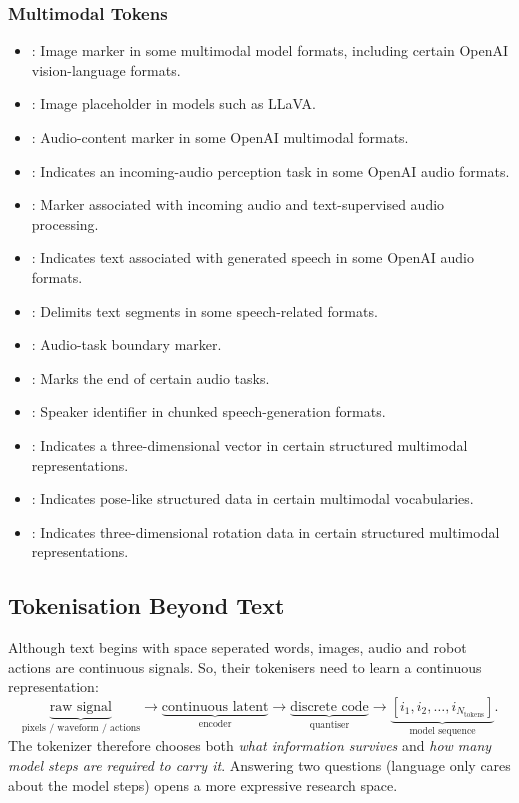 \subsubsection{Multimodal Tokens}

\begin{itemize}
    \item {}: Image marker in some multimodal model formats, including certain OpenAI vision-language formats.
    \item {}: Image placeholder in models such as LLaVA.
    \item {}: Audio-content marker in some OpenAI multimodal formats.
    \item {}: Indicates an incoming-audio perception task in some OpenAI audio formats.
    \item {}: Marker associated with incoming audio and text-supervised audio processing.
    \item {}: Indicates text associated with generated speech in some OpenAI audio formats.
    \item {}: Delimits text segments in some speech-related formats.
    \item {}: Audio-task boundary marker.
    \item {}: Marks the end of certain audio tasks.
    \item {}: Speaker identifier in chunked speech-generation formats.
    \item {}: Indicates a three-dimensional vector in certain structured multimodal representations.
    \item {}: Indicates pose-like structured data in certain multimodal vocabularies.
    \item {}: Indicates three-dimensional rotation data in certain structured multimodal representations.
\end{itemize}




\subsection{Tokenisation Beyond Text}

Although text begins with space seperated words, images, audio and robot actions are continuous signals.
So, their tokenisers need to learn a continuous representation:
\[
    \underbrace{\text{raw signal}}_{\text{pixels / waveform / actions}}
    \rightarrow
    \underbrace{\text{continuous latent}}_{\text{encoder}}
    \rightarrow
    \underbrace{\text{discrete code}}_{\text{quantiser}}
    \rightarrow
    \underbrace{[i_1,i_2,\ldots,i_{N_{\text{tokens}}}]}_{\text{model sequence}}.
\]
The tokenizer therefore chooses both \textit{what information survives} and \textit{how many model steps are required to carry it}.
Answering two questions (language only cares about the model steps) opens a more expressive research space.


